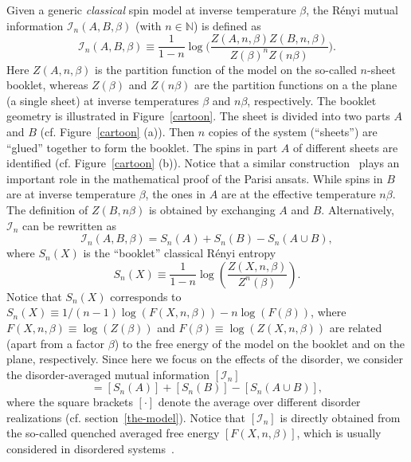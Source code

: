 \documentclass[twocolumn,superscriptaddress,prb,10pt]{revtex4-1}
\begin{document}
Given a generic \emph{classical} spin model at inverse temperature $\beta$, 
the R\'enyi mutual information ${\mathcal I}_n(A,B,\beta)$ (with $n\in\mathbb{N}$) 
is defined as~\cite{jaconis-2013,stephan-2014} 
%
\begin{equation}
\label{MI}
{\mathcal I}_n(A,B,\beta)\equiv\frac{1}{1-n}\log\Big(
\frac{Z(A,n,\beta)Z(B,n,\beta)}{Z(\beta)^nZ(n\beta)}
\Big).
\end{equation}
%
Here $Z(A,n,\beta)$ is the partition function of the model on the so-called 
$n$-sheet booklet, whereas $Z(\beta)$ and $Z(n\beta)$ are the partition functions 
on a the plane (a single sheet) at inverse temperatures $\beta$ and $n\beta$, 
respectively. The booklet geometry is illustrated in Figure~\ref{cartoon}. The 
sheet is divided into two parts $A$ and $B$ (cf. Figure~\ref{cartoon} (a)). 
Then $n$ copies of the system (``sheets'') are ``glued'' together to form the 
booklet. The spins in part $A$ of different sheets are identified (cf. 
Figure~\ref{cartoon} (b)). Notice that a similar construction~\cite{guerra-2002} 
plays an important role in the mathematical proof of the Parisi ansats. While spins 
in $B$ are at inverse temperature $\beta$, the ones in $A$ are at the effective 
temperature $n\beta$. The definition of $Z(B,n\beta)$ is obtained by exchanging 
$A$ and $B$. Alternatively, ${\mathcal I}_n$ can be rewritten as 
%
\begin{equation}
{\mathcal I}_n(A,B,\beta)=S_n(A)+S_n(B)-S_n(A\cup B),
\end{equation}
%
where $S_n(X)$ is the ``booklet'' classical R\'enyi entropy
%
\begin{equation}
\label{renyi}
S_n(X)\equiv \frac{1}{1-n}\log\left(\frac{Z(X,n,\beta)}{Z^n(\beta)}\right).
\end{equation}
%
Notice that $S_n(X)$ corresponds to $S_n(X)\equiv1/(n-1)\log(F(X,n,\beta))
-n\log(F(\beta))$, where $F(X,n,\beta)\equiv\log(Z(\beta))$ and $F(\beta)
\equiv\log(Z(X,n,\beta))$ are related (apart from a factor $\beta$) to the 
free energy of the model on the booklet and on the plane, respectively.
Since here we focus on the effects of the disorder, we consider 
the disorder-averaged mutual information $[{\mathcal I}_n]$ 
%
\begin{equation}
[{\mathcal I}_n(A,B,\beta)]=[S_n(A)]+[S_n(B)]-[S_n(A\cup B)],
\end{equation}
%
where the square brackets $[\cdot]$ denote the average over different disorder 
realizations (cf. section~\ref{the-model}). Notice that $[{\mathcal I}_n]$ is 
directly obtained from the so-called quenched averaged free energy $[F(X,n,\beta)]$, 
which is usually considered in disordered systems~\cite{cardy-book}. 
\end{document}
